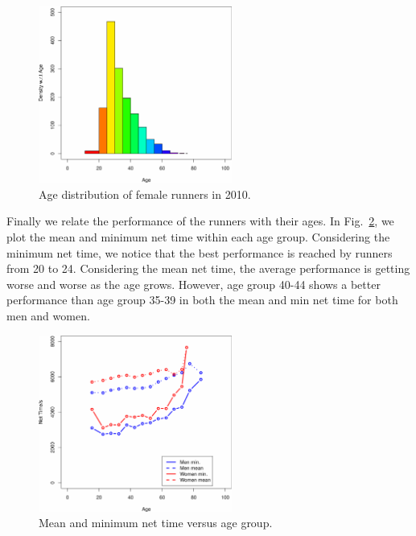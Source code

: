\documentclass[twocolumn]{article}
\begin{document}
\begin{figure}[!h]
    \centering
    \includegraphics[width=2.5in]{figs/group_f2010.pdf}
    \caption{Age distribution of female runners in 2010.}
    \label{fig:age_female}
\end{figure}

Finally we relate the performance of the runners with their ages. In
Fig.~\ref{fig:time_group_age}, we plot the mean and minimum net time within each
age group. Considering the minimum net time, we notice that the best
performance is reached by runners from 20 to 24. Considering the mean net time,
the average performance is getting worse and worse as the age grows. However,
age group 40-44 shows a better performance than age group 35-39 in both the mean
and min net time for both men and women.

\begin{figure}[!h]
    \centering
    \includegraphics[width=2.5in]{figs/time_net_group_2010.pdf}
    \caption{Mean and minimum net time versus age group.}
    \label{fig:time_group_age}
\end{figure}

%
%

\end{document}
